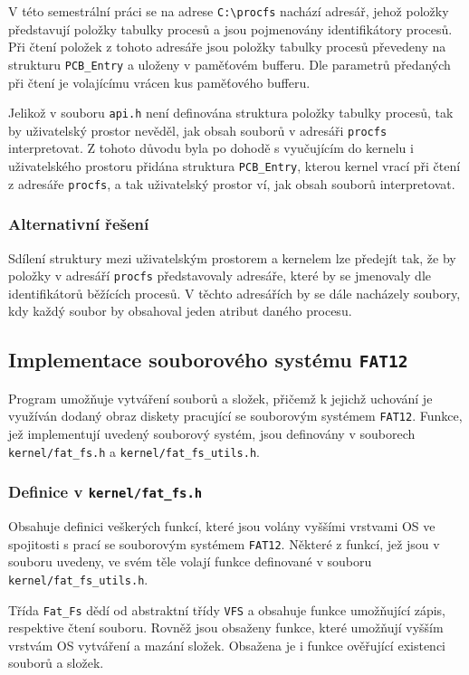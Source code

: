 \documentclass[12pt, a4paper]{article}
\begin{document}
V této semestrální práci se na adrese \texttt{C:\textbackslash procfs} nachází adresář, jehož položky představují položky tabulky procesů a jsou pojmenovány identifikátory procesů. Při čtení položek z tohoto adresáře jsou položky tabulky procesů převedeny na strukturu \texttt{PCB\_Entry} a uloženy v paměťovém bufferu. Dle parametrů předaných při čtení je volajícímu vrácen kus paměťového bufferu.

Jelikož v souboru \texttt{api.h} není definována struktura položky tabulky procesů, tak by uživatelský prostor nevěděl, jak obsah souborů v adresáři \texttt{procfs} interpretovat. Z tohoto důvodu byla po dohodě s vyučujícím do kernelu i uživatelského prostoru přidána struktura \texttt{PCB\_Entry}, kterou kernel vrací při čtení z adresáře \texttt{procfs}, a tak uživatelský prostor ví, jak obsah souborů interpretovat.

\subsubsection{Alternativní řešení}
Sdílení struktury mezi uživatelským prostorem a kernelem lze předejít tak, že by položky v adresáří \texttt{procfs} představovaly adresáře, které by se jmenovaly dle identifikátorů běžících procesů. V těchto adresářích by se dále nacházely soubory, kdy každý soubor by obsahoval jeden atribut daného procesu.


\subsection{Implementace souborového systému \texttt{FAT12}}
Program umožňuje vytváření souborů a složek, přičemž k jejichž uchování je využíván dodaný obraz diskety pracující se souborovým systémem \texttt{FAT12}. Funkce, jež implementují uvedený souborový systém, jsou definovány v souborech \texttt{kernel/fat\_fs.h} a \texttt{kernel/fat\_fs\_utils.h}.

\subsubsection{Definice v \texttt{kernel/fat\_fs.h}}
Obsahuje definici veškerých funkcí, které jsou volány vyššími vrstvami OS ve spojitosti s prací se souborovým systémem \texttt{FAT12}. Některé z funkcí, jež jsou v souboru uvedeny, ve svém těle volají funkce definované v souboru \texttt{kernel/fat\_fs\_utils.h}.

Třída \texttt{Fat\_Fs} dědí od abstraktní třídy \texttt{VFS} a obsahuje funkce umožňující zápis, respektive čtení souboru. Rovněž jsou obsaženy funkce, které umožňují vyšším vrstvám OS vytváření a mazání složek. Obsažena je i funkce ověřující existenci souborů a složek.
\end{document}
